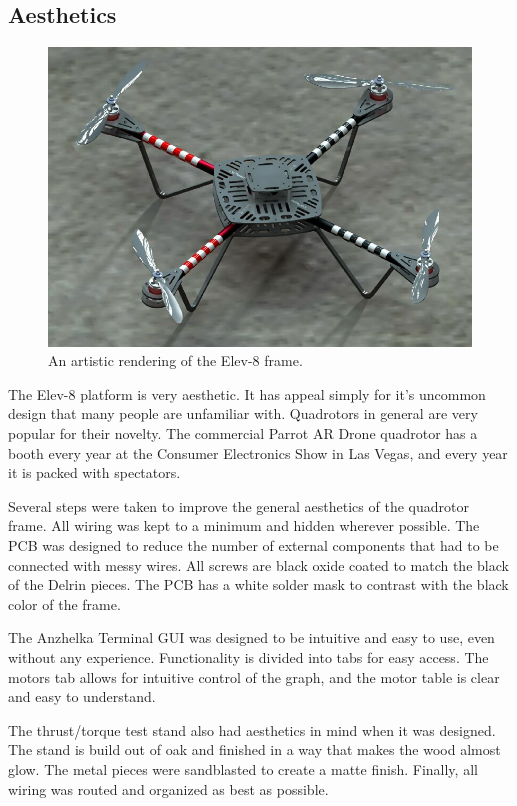 \documentclass{article}
\numberwithin{equation}{section} %
\begin{document}
\subsection{Aesthetics}
\begin{figure}[h!]
  \centering
	\includegraphics[scale=.35]{elev_8_artistic_rendering.jpg}
  \caption{An artistic rendering of the Elev-8 frame.}
\end{figure}  

The Elev-8 platform is very aesthetic. It has appeal simply for it's uncommon design that many people are unfamiliar with. Quadrotors in general are very popular for their novelty. The commercial Parrot AR Drone quadrotor has a booth every year at the Consumer Electronics Show in Las Vegas, and every year it is packed with spectators.

Several steps were taken to improve the general aesthetics of the quadrotor frame. All wiring was kept to a minimum and hidden wherever possible. The PCB was designed to reduce the number of external components that had to be connected with messy wires. All screws are black oxide coated to match the black of the Delrin pieces. The PCB has a white solder mask to contrast with the black color of the frame.

The Anzhelka Terminal GUI was designed to be intuitive and easy to use, even without any experience. Functionality is divided into tabs for easy access. The motors tab allows for intuitive control of the graph, and the motor table is clear and easy to understand. 

The thrust/torque test stand also had aesthetics in mind when it was designed. The stand is build out of oak and finished in a way that makes the wood almost glow. The metal pieces were sandblasted to create a matte finish. Finally, all wiring was routed and organized as best as possible.
\end{document}
